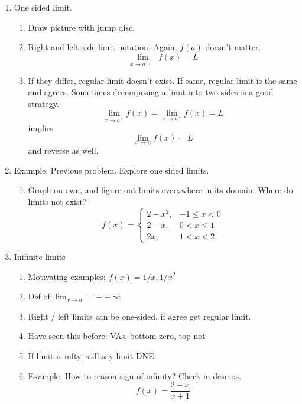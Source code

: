 \documentclass{article}
\begin{document}
\begin{enumerate}
\item One sided limit.
\begin{enumerate}
\item Draw picture with jump disc.
\item Right and left side limit notation. Again, $f(a)$ doesn't matter.
\[
\lim_{x \rightarrow a^{+/-}} f(x) = L
\]
\item If they differ, regular limit doesn't exist. If same, regular limit is the same and agrees. Sometimes decomposing a limit into two sides is a good strategy.
\[
\lim_{x \rightarrow a^{+}} f(x) = \lim_{x \rightarrow a^{-}} f(x) = L
\]
implies
\[ \lim_{x \rightarrow a} f(x) = L
\]
and reverse as well.
\end{enumerate}

\item Example: Previous problem. Explore one sided limits.
\begin{enumerate}
\item Graph on own, and figure out limits everywhere in its domain. Where do limits not exist?
\[
f(x) = \begin{cases}
2-x^2, & -1 \leq x < 0 \\
2-x, & 0<x \leq 1 \\
2x, & 1<x<2
\end{cases}
\]
\end{enumerate}

\item Inifinite limits
\begin{enumerate}
\item Motivating examples: $f(x)=1/x, 1/x^2$
\item Def of $\lim_{x \rightarrow a} = +- \infty$
\item Right / left limits can be one-sided, if agree get regular limit. 
\item Have seen this before: VAs, bottom zero, top not
\item If limit is infty, still say limit DNE
\item Example: How to reason sign of infinity? Check in desmos. 
\[
f(x) = \frac{2-x}{x+1}
\]
\end{enumerate}
\end{enumerate}
\end{document}
